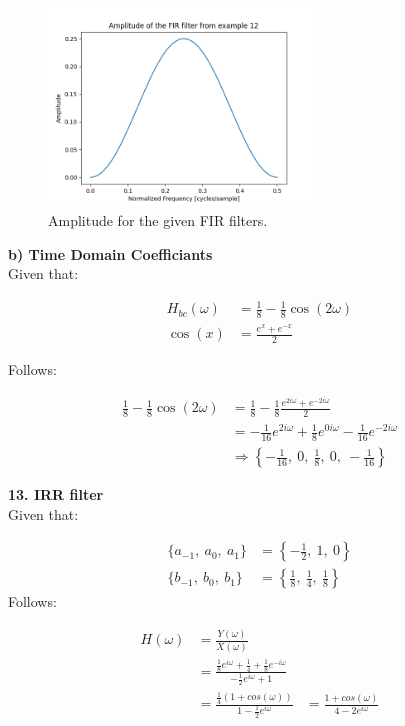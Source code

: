 \begin{figure}[h]
	\centering
	\includegraphics[width=7cm]{img/ex_12.png}
	\captionsetup{width=5cm}
	\caption{Amplitude for the given FIR filters.}
\end{figure}

\newpage

\textbf{b) Time Domain Coefficiants} \\

Given that:

\begin{align}
	H_{bc}(\omega) &= \frac{1}{8} - \frac{1}{8} \cos(2\omega) \\
	\cos(x) &= \frac{e^x + e^{-x}}{2}
\end{align}

Follows:

\begin{align*}
	\frac{1}{8} - \frac{1}{8} \cos(2\omega) &= \frac{1}{8} - \frac{1}{8} \frac{e^{2i\omega} + e^{-2i\omega}}{2} \\ 
	&= -\frac{1}{16} e^{2i\omega} + \frac{1}{8} e^{0i\omega} - \frac{1}{16} e^{-2i\omega} \\
	&\Rightarrow \left\{ -\frac{1}{16},\ 0,\ \frac{1}{8},\ 0,\ -\frac{1}{16} \right\}
\end{align*}

\textbf{\large 13. IRR filter}
\\

Given that:

\begin{align}
	\{a_{-1},\ a_0,\ a_1\} &= \left\{-\frac{1}{2},\ 1,\ 0\right\} \\
	\{b_{-1},\ b_0,\ b_1\} &= \left\{\frac{1}{8},\ \frac{1}{4},\ \frac{1}{8}\right\}
\end{align}
Follows:

\begin{align*}
	H(\omega) &= \frac{Y(\omega)}{X(\omega)}\\
	&= \frac{\frac{1}{8} e^{i\omega} + \frac{1}{4} + \frac{1}{8} e^{-i\omega}}{-\frac{1}{2} e^{i\omega} + 1}\\
	&= \frac{\frac{1}{4} (1 + cos(\omega))}{1 - \frac{1}{2} e^{i\omega}}
	&= \frac{1 + cos(\omega)}{4 - 2 e^{i\omega}}
\end{align*}

